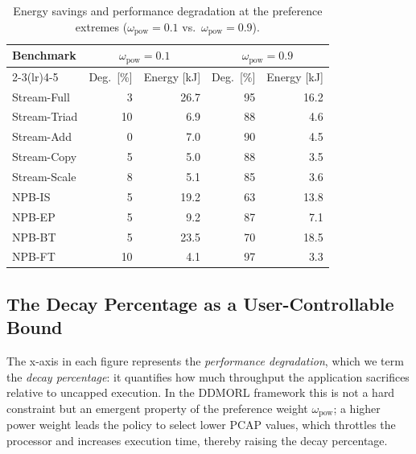 \begin{table}[tbp]
\centering
\caption{Energy savings and performance degradation at the preference extremes
       ($\omega_\text{pow}=0.1$ vs.\ $\omega_\text{pow}=0.9$).}
\label{tab:energy_savings}
\begin{tabular}{lrrrr}
\toprule
\multirow{2}{*}{\textbf{Benchmark}} &
\multicolumn{2}{c}{$\omega_\text{pow}=0.1$} &
\multicolumn{2}{c}{$\omega_\text{pow}=0.9$} \\
\cmidrule(lr){2-3}\cmidrule(lr){4-5}
& Deg.\ [\%] & Energy [kJ] & Deg.\ [\%] & Energy [kJ] \\
\midrule
Stream-Full  &  3 & 26.7 & 95  & 16.2 \\
Stream-Triad & 10 &  6.9 & 88  &  4.6 \\
Stream-Add   &  0 &  7.0 & 90  &  4.5 \\
Stream-Copy  &  5 &  5.0 & 88  &  3.5 \\
Stream-Scale &  8 &  5.1 & 85  &  3.6 \\
NPB-IS       &  5 & 19.2 & 63  & 13.8 \\
NPB-EP       &  5 &  9.2 & 87  &  7.1 \\
NPB-BT       &  5 & 23.5 & 70  & 18.5 \\
NPB-FT       & 10 &  4.1 & 97  &  3.3 \\
\bottomrule
\end{tabular}
\end{table}

\subsection{The Decay Percentage as a User-Controllable Bound}

The x-axis in each figure represents the \emph{performance degradation}, which we term the \emph{decay percentage}: it quantifies how much throughput the application sacrifices relative to uncapped execution. In the DDMORL framework this is not a hard constraint but an emergent property of the preference weight $\omega_\text{pow}$; a higher power weight leads the policy to select lower PCAP values, which throttles the processor and increases execution time, thereby raising the decay percentage.

